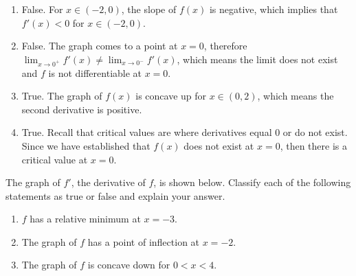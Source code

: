\begin{Answer}[ref = shape1]
\begin{enumerate}
\item False. For $x \in (-2, 0)$, the slope of $f(x)$ is negative, which 
implies that $f'(x) < 0$ for $x \in (-2, 0)$.
\item False. The graph comes to a point at $x = 0$, therefore $\lim_{x \to 
0^+} f'(x) \neq \lim_{x \to 0^-} f'(x)$, which means the limit does not 
exist and $f$ is not differentiable at $x = 0$.
\item True. The graph of $f(x)$ is concave up for $x \in (0, 2)$, which means 
the second derivative is positive. 
\item True. Recall that critical values are where derivatives equal 0 or do 
not exist. Since we have established that $f(x)$ does not exist at $x = 0$, 
then there is a critical value at $x = 0$. 
\end{enumerate}
\end{Answer}

\begin{Exercise} The graph of $f'$, 
the derivative of $f$, is shown below. Classify each of the following 
statements as true or false and explain your answer. 

\begin{enumerate}
\item $f$ has a relative minimum at $x = -3$.
\item The graph of $f$ has a point of inflection at $x = -2$.
\item The graph of $f$ is concave down for $0 < x < 4$.
\end{enumerate}

\end{Exercise}

